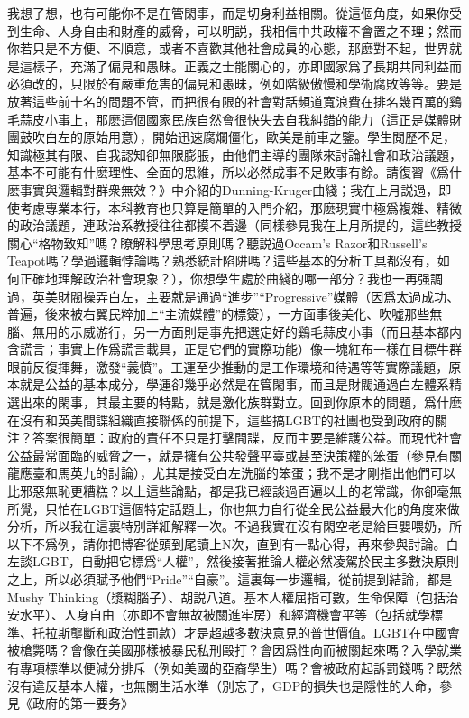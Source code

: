 \documentclass[twocolumn]{ctexart}
\begin{document}
我想了想，也有可能你不是在管閑事，而是切身利益相關。從這個角度，如果你受到生命、人身自由和財產的威脅，可以明説，我相信中共政權不會置之不理；然而你若只是不方便、不順意，或者不喜歡其他社會成員的心態，那麽對不起，世界就是這樣子，充滿了偏見和愚昧。正義之士能關心的，亦即國家爲了長期共同利益而必須改的，只限於有嚴重危害的偏見和愚昧，例如階級傲慢和學術腐敗等等。要是放著這些前十名的問題不管，而把很有限的社會對話頻道寬浪費在排名幾百萬的鷄毛蒜皮小事上，那麽這個國家民族自然會很快失去自我糾錯的能力（這正是媒體財團鼓吹白左的原始用意），開始迅速腐爛僵化，歐美是前車之鑒。學生閲歷不足，知識極其有限、自我認知卻無限膨脹，由他們主導的團隊來討論社會和政治議題，基本不可能有什麽理性、全面的思維，所以必然成事不足敗事有餘。請復習《爲什麽事實與邏輯對群衆無效？》中介紹的Dunning-Kruger曲綫；我在上月説過，即使考慮專業本行，本科教育也只算是簡單的入門介紹，那麽現實中極爲複雜、精微的政治議題，連政治系教授往往都摸不着邊（同樣參見我在上月所提的，這些教授關心“格物致知”嗎？瞭解科學思考原則嗎？聽説過Occam's Razor和Russell's Teapot嗎？學過邏輯悖論嗎？熟悉統計陷阱嗎？這些基本的分析工具都沒有，如何正確地理解政治社會現象？），你想學生處於曲綫的哪一部分？我也一再强調過，英美財閥操弄白左，主要就是通過“進步”“Progressive”媒體（因爲太過成功、普遍，後來被右翼民粹加上“主流媒體”的標簽），一方面事後美化、吹噓那些無腦、無用的示威游行，另一方面則是事先把選定好的鷄毛蒜皮小事（而且基本都内含謊言；事實上作爲謊言載具，正是它們的實際功能）像一塊紅布一樣在目標牛群眼前反復揮舞，激發“義憤”。工運至少推動的是工作環境和待遇等等實際議題，原本就是公益的基本成分，學運卻幾乎必然是在管閑事，而且是財閥通過白左體系精選出來的閑事，其最主要的特點，就是激化族群對立。回到你原本的問題，爲什麽在沒有和英美間諜組織直接聯係的前提下，這些搞LGBT的社團也受到政府的關注？答案很簡單：政府的責任不只是打擊間諜，反而主要是維護公益。而現代社會公益最常面臨的威脅之一，就是擁有公共發聲平臺或甚至決策權的笨蛋（參見有關龍應臺和馬英九的討論），尤其是接受白左洗腦的笨蛋；我不是才剛指出他們可以比邪惡無恥更糟糕？以上這些論點，都是我已經談過百遍以上的老常識，你卻毫無所覺，只怕在LGBT這個特定話題上，你也無力自行從全民公益最大化的角度來做分析，所以我在這裏特別詳細解釋一次。不過我實在沒有閑空老是給巨嬰喂奶，所以下不爲例，請你把博客從頭到尾讀上N次，直到有一點心得，再來參與討論。白左談LGBT，自動把它標爲“人權”，然後接著推論人權必然凌駕於民主多數決原則之上，所以必須賦予他們“Pride”“自豪”。這裏每一步邏輯，從前提到結論，都是Mushy Thinking（漿糊腦子）、胡説八道。基本人權屈指可數，生命保障（包括治安水平）、人身自由（亦即不會無故被關進牢房）和經濟機會平等（包括就學標準、托拉斯壟斷和政治性罰款）才是超越多數決意見的普世價值。LGBT在中國會被槍斃嗎？會像在美國那樣被暴民私刑毆打？會因爲性向而被關起來嗎？入學就業有專項標準以便減分排斥（例如美國的亞裔學生）嗎？會被政府起訴罰錢嗎？既然沒有違反基本人權，也無關生活水準（別忘了，GDP的損失也是隱性的人命，參見《政府的第一要务》 
\end{document}
